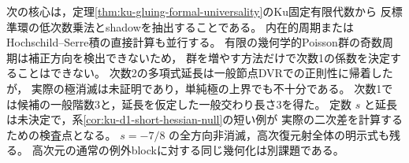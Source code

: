 \documentclass[a4paper,11pt]{ltjsarticle}
\numberwithin{equation}{section}
\theoremstyle{plain}
\theoremstyle{definition}
\theoremstyle{remark}
\begin{document}
次の核心は，定理\ref{thm:ku-gluing-formal-universality}のKu固定有限代数から
反標準環の低次数乗法とshadowを抽出することである。
内在的周期またはHochschild--Serre積の直接計算も並行する。
有限の幾何学的Poisson群の奇数周期は補正方向を検出できないため，
群を増やす方法だけで次数1の係数を決定することはできない。
次数2の多項式延長は一般節点DVRでの正則性に帰着したが，
実際の極消滅は未証明であり，単純極の上界でも不十分である。
次数1では候補の一般階数3と，延長を仮定した一般交わり長さ3を得た。
定数 $s$ と延長は未決定で，系\ref{cor:ku-d1-short-hessian-null}の短い例が
実際の二次差を計算するための検査点となる。
$s=-7/8$ の全方向非消滅，高次復元射全体の明示式も残る。
高次元の通常の例外blockに対する同じ幾何化は別課題である。

\begingroup
\small


\endgroup
\end{document}
